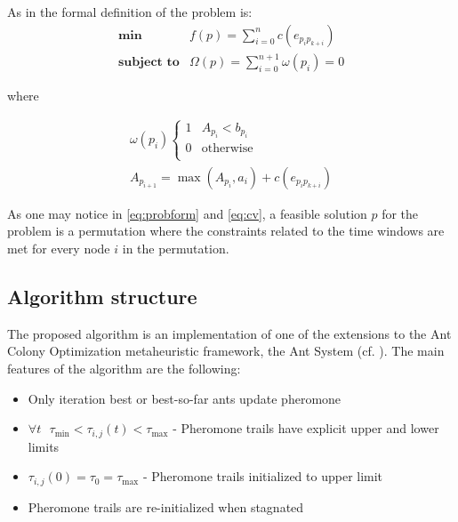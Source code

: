 \begin{homeworkProblem}
As in \cite{lopez2010beam} the formal definition of the problem is:
\begin{equation} \label{eq:probform}
 \begin{array}{rl}
  \textbf{min} & f(p)= \sum\limits_{i=0}^{n} c(e_{p_{i}p_{k+i}}) \\
  \textbf{subject to} & \Omega(p)= \sum\limits_{i=0}^{n+1} \omega(p_{i}) = 0
 \end{array}
\end{equation}

where

\begin{equation} \label{eq:cv}
\begin{array}{c}
 \omega(p_{i}) \begin{cases}
                1 & A_{p_i} < b_{p_i}  \\
                0 & \text{otherwise} \\   
               \end{cases} \\
 A_{p_{i+1}} = \max(A_{p_i},a_i) + c(e_{p_{i}p_{k+i}}) 
\end{array}
\end{equation}

As one may notice in \ref{eq:probform} and \ref{eq:cv}, a feasible solution $p$ for the problem is a permutation where the constraints related to the time windows are met for every node $i$ in the permutation.

\subsection{Algorithm structure}
The proposed algorithm is an implementation of one of the extensions to the Ant Colony Optimization metaheuristic framework, the \maxmin Ant System (cf. \cite{stutzle2000max}).
The main features of the algorithm are the following:
\begin{itemize}
  \item Only iteration best or best-so-far ants update pheromone
  \item $\forall t \text{ } \tau_{\min} < \tau_{i,j}(t) < \tau_{\max}  $ - Pheromone trails have explicit upper and lower limits
  \item $\tau_{i,j}(0) = \tau_0 = \tau_{\max}$ - Pheromone trails initialized to upper limit
  \item Pheromone trails are re-initialized when stagnated
\end{itemize}


\end{homeworkProblem}
